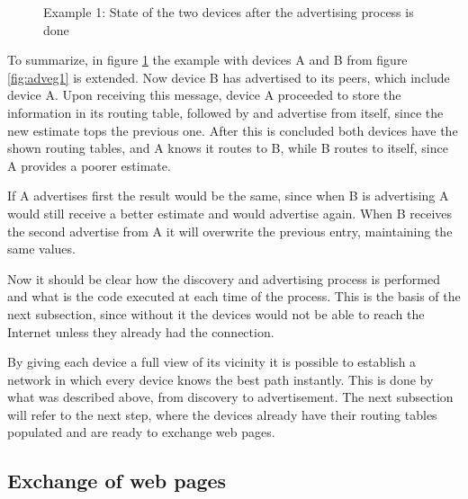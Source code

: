 \begin{figure}[ht]
   \noindent{}
	\caption{\label{fig:adveg2} Example 1: State of the two devices after the advertising process is done} 
\end{figure}

To summarize, in figure \ref{fig:adveg2} the example with devices A and B from figure \ref{fig:adveg1} is extended. Now device B has advertised to its peers, which include device A. Upon receiving this message, device A proceeded to store the information in its routing table, followed by and advertise from itself, since the new estimate tops the previous one. After this is concluded both devices have the shown routing tables, and A knows it routes to B, while B routes to itself, since A provides a poorer estimate.

If A advertises first the result would be the same, since when B is advertising A would still receive a better estimate and would advertise again. When B receives the second advertise from A it will overwrite the previous entry, maintaining the same values.

Now it should be clear how the discovery and advertising process is performed and what is the code executed at each time of the process. This is the basis of the next subsection, since without it the devices would not be able to reach the Internet unless they already had the connection.

By giving each device a full view of its vicinity it is possible to establish a network in which every device knows the best path instantly. This is done by what was described above, from discovery to advertisement. The next subsection will refer to the next step, where the devices already have their routing tables populated and are ready to exchange web pages. 

\subsection{Exchange of web pages}

